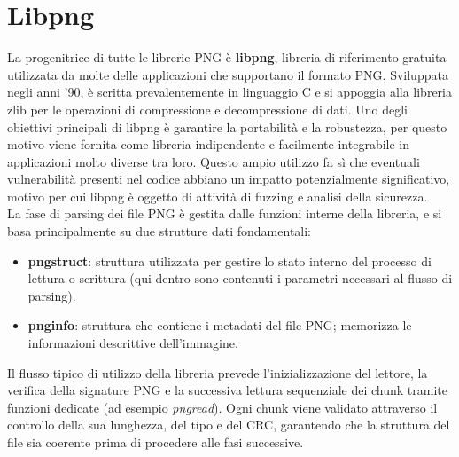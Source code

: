 \section{Libpng}
La progenitrice di tutte le librerie PNG è \textbf{libpng}, libreria di riferimento gratuita utilizzata da molte delle applicazioni che supportano il formato PNG.
Sviluppata negli anni '90, è scritta prevalentemente in linguaggio C e si appoggia alla libreria zlib per le operazioni di compressione e decompressione di dati.
Uno degli obiettivi principali di libpng è garantire la portabilità e la robustezza, per questo motivo viene fornita come libreria indipendente e facilmente integrabile in applicazioni molto diverse tra loro.
Questo ampio utilizzo fa sì che eventuali vulnerabilità presenti nel codice abbiano un impatto potenzialmente significativo, motivo per cui libpng è oggetto di attività di fuzzing e analisi della sicurezza.\\
La fase di parsing dei file PNG è gestita dalle funzioni interne della libreria, e si basa principalmente su due strutture dati fondamentali:
\begin{itemize}
    \item \textbf{pngstruct}: struttura utilizzata per gestire lo stato interno del processo di lettura o scrittura (qui dentro sono contenuti i parametri necessari al flusso di parsing).
    \item \textbf{pnginfo}: struttura che contiene i metadati del file PNG; memorizza le informazioni descrittive dell'immagine.  
\end{itemize}
Il flusso tipico di utilizzo della libreria prevede l'inizializzazione del lettore, la verifica della signature PNG e la successiva lettura sequenziale dei chunk tramite funzioni dedicate (ad esempio \textit{pngread}).
Ogni chunk viene validato attraverso il controllo della sua lunghezza, del tipo e del CRC, garantendo che la struttura del file sia coerente prima di procedere alle fasi successive.




